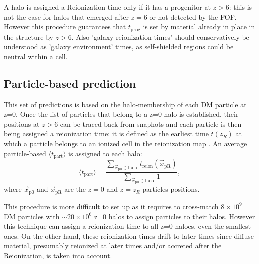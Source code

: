 \documentclass[twocolumn]{aastex61}
\begin{document}
A halo is assigned a Reionization time only if it has a progenitor at $z>6$: this is not the case for halos that emerged after $z=6$ or not detected by the FOF. %
However this procedure guarantees that $t_\mathrm{prog}$ is set by material already in place in the structure by $z>6$. Also 'galaxy reionization times' should conservatively be understood as 'galaxy environment' times, as self-shielded regions could be neutral within a cell.



\subsection{Particle-based prediction}
This set of predictions is based on the halo-membership of each DM particle at z=0. %
 Once the list of particles that belong to a z=0 halo is established, their positions at $z>6$ can be traced-back from snaphots and each particle is then being assigned a reionization time: it is defined as the earliest time $t(z_R)$ at which a particle belongs to an ionized cell in the reionization map . An average particle-based $\langle t_\mathrm{part} \rangle$  is assigned to each halo:
\begin{equation}
\langle t_\mathrm{part}\rangle=\frac{\sum_{\vec x_\mathrm{p0} \in \mathrm{halo} \ } t_\mathrm{reion}(\vec x_\mathrm{pR})}{\sum_{\vec x_\mathrm{p0} \in \mathrm{halo} \ } 1},
\end{equation}
where $\vec x_\mathrm{p0}$ and $\vec x_\mathrm{pR}$ are the $z=0$ and $z=z_R$ particles positions.

This procedure is more difficult to set up as it requires to cross-match $8\times 10^9$ DM particles with $\sim 20\times 10^6$ z=0 halos  to assign particles to their halos. 
However this technique can assign a reionization time to all z=0 haloes, even the smallest ones. On the other hand, these reionization times drift to later times since diffuse material, presumably reionized at later times and/or  accreted after the Reionization, is taken into account. 
 
\end{document}
